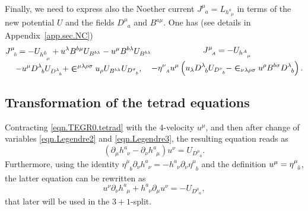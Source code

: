 \documentclass[
10pt, %
a4paper, %
oneside, %
twocolumn,
headinclude,footinclude, %
BCOR5mm, %
]{scrartcl}
\newcommand{\sA}{\mathsmaller A}
\newcommand{\tetrsymbol}{h}
\newcommand{\itetrsymbol}{\eta}
\newcommand{\itetr}[2]{\itetrsymbol^{#1}_{\phantom{#1}#2}}
\newcommand{\tetr}[2]{\tetrsymbol^{#1}_{\phantom{#1}#2}}
\newcommand{\D}[1]{\partial_{#1}} %
\newcommand{\Tors}[2]{T^{#1}_{\phantom{#1}#2}}
\newcommand{\Dm}[2]{D_{\phantom{#2}#1}^{#2}}	%
\newcommand{\Bm}[2]{B^{#1#2}}	%
\newcommand{\Laghodge}{L}%
\newcommand{\Um}{U}%
\newcommand{\EM}[2]{\Sigma^{#1}_{\phantom{#1}#2}}
\newcommand{\LCsymb}{\bm{\in}}    %
\newcommand{\NC}[2]{J^{#2}_{\phantom{#2}#1}}
\newcommand{\indalg}[1]{\hat{\mathsmaller{#1}}}
\begin{document}
	
	Finally, we need to express also the Noether current $ \NC{a}{\mu} = \Laghodge_{\tetr{a}{\mu}} 
	$ in 
	terms of the 
	new potential $ \Um $ and the fields $ \Dm{a}{\mu} $ and $ \Bm{a}{\mu} $. One has (see details 
	in Appendix~\ref{app.sec.NC})
	\begin{subequations}\label{eqn.JiA}
		\begin{multline}\label{eqn.Ji0}
			\NC{\indalg{0}}{\mu} = 
				-\Um_{\tetr{\indalg{0}}{\mu}}
				+ u^\lambda \Bm{b}{\mu} \Um_{\Bm{b}{\lambda}} 
				- u^\mu \Bm{b}{\lambda} \Um_{\Bm{b}{\lambda}}\\ 
				- u^\mu \Dm{b}{\lambda} \Um_{\Dm{b}{\lambda}}
				+ \LCsymb^{\mu\lambda\rho\sigma} u_\rho \Um_{\Bm{b}{\lambda}}
				\Um_{\Dm{b}{\sigma}},
		\end{multline}
		\begin{multline}
				\NC{\sA}{\mu} = -\Um_{\tetr{\sA}{\mu}}	\\
				- \itetr{\nu}{\sA}u^\mu
				\left(
				u_\lambda \Dm{b}{\lambda} \Um_{\Dm{b}{\nu}} 
				- \LCsymb_{\nu\lambda\rho\sigma}u^\rho\Bm{b}{\sigma}\Dm{b}{\lambda}
				\right).
		\end{multline}
	\end{subequations}	


	\subsection{Transformation of the tetrad equations}
	
	
	
	Contracting \eqref{eqn.TEGR0.tetrad} with the 4-velocity $ u^\mu $, and then after 
	change of variables \eqref{eqn.Legendre2} and \eqref{eqn.Legendre3}, the 
	resulting equation reads as
	\begin{equation}
		(\D{\mu}\tetr{a}{\nu} - \D{\nu}\tetr{a}{\mu}) u^\nu = \Um_{\Dm{a}{\mu}}.
	\end{equation}
	Furthermore, using the identity $ \itetr{\mu}{b}\D{\nu}\tetr{a}{\nu} = - 
	\tetr{a}{\nu}\D{\nu}\itetr{\mu}{b}$ and the definition $ u^\mu = \itetr{\mu}{\indalg{0}} 
	$, the 
	latter equation can be rewritten as
	\begin{equation}
		u^\nu\D{\nu}\tetr{a}{\mu} + \tetr{a}{\nu}\D{\mu}u^\nu =-\Um_{\Dm{a}{\mu}},
	\end{equation}
	that later will be used in the $ 3+1 $-split.
	
\end{document}
